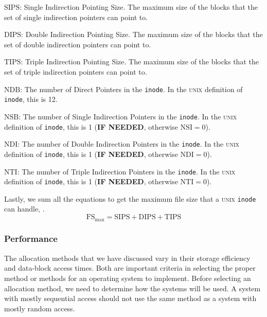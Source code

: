 \begin{description}[noitemsep]
\item $\mathrm{SIPS}$: Single Indirection Pointing Size.
  The maximum size of the blocks that the set of single indirection pointers can point to.
\item $\mathrm{DIPS}$: Double Indirection Pointing Size.
  The maximum size of the blocks that the set of double indirection pointers can point to.
\item $\mathrm{TIPS}$: Triple Indirection Pointing Size.
  The maximum size of the blocks that the set of triple indirection pointers can point to.
\item $\mathrm{NDB}$: The number of Direct Pointers in the \texttt{inode}.
  In the \textsc{unix} definition of \texttt{inode}, this is 12.
\item $\mathrm{NSB}$: The number of Single Indirection Pointers in the \texttt{inode}.
  In the \textsc{unix} definition of \texttt{inode}, this is 1 (\textbf{IF NEEDED}, otherwise $\mathrm{NSI} = 0$).
\item $\mathrm{NDI}$: The number of Double Indirection Pointers in the \texttt{inode}.
  In the \textsc{unix} definition of \texttt{inode}, this is 1 (\textbf{IF NEEDED}, otherwise $\mathrm{NDI} = 0$).
\item $\mathrm{NTI}$: The number of Triple Indirection Pointers in the \texttt{inode}.
  In the \textsc{unix} definition of \texttt{inode}, this is 1 (\textbf{IF NEEDED}, otherwise $\mathrm{NTI} = 0$).
\end{description}

Lastly, we sum all the equations  to get the maximum file size that a \textsc{unix} \texttt{inode} can handle, .
\begin{equation}\label{eq:Inode_Max_File_Size}
  \mathrm{FS}_{\max} = \mathrm{SIPS} + \mathrm{DIPS} + \mathrm{TIPS}
\end{equation}

\subsubsection{Performance}\label{subsubsec:File_Allocation_Performance}
The allocation methods that we have discussed vary in their storage efficiency
and data-block access times. Both are important criteria in selecting the proper
method or methods for an operating system to implement.
Before selecting an allocation method, we need to determine how the
systems will be used. A system with mostly sequential access should not use
the same method as a system with mostly random access.

